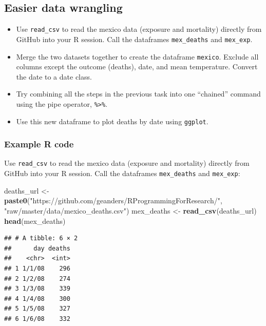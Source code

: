 \documentclass[]{book}
\makeatletter
\newenvironment{Shaded}{\begin{snugshade}}{\end{snugshade}}
\newcommand{\KeywordTok}[1]{\textcolor[rgb]{0.13,0.29,0.53}{\textbf{{#1}}}}
\newcommand{\StringTok}[1]{\textcolor[rgb]{0.31,0.60,0.02}{{#1}}}
\newcommand{\NormalTok}[1]{{#1}}
\providecommand{\tightlist}{%
  \setlength{\itemsep}{0pt}\setlength{\parskip}{0pt}}
\newenvironment{kframe}{%
\medskip{}
\setlength{\fboxsep}{.8em}
 \def\at@end@of@kframe{}%
 \ifinner\ifhmode%
  \def\at@end@of@kframe{\end{minipage}}%
  \begin{minipage}{\columnwidth}%
 \fi\fi%
 \def\FrameCommand##1{\hskip\@totalleftmargin \hskip-\fboxsep
 \colorbox{shadecolor}{##1}\hskip-\fboxsep
     \hskip-\linewidth \hskip-\@totalleftmargin \hskip\columnwidth}%
 \MakeFramed {\advance\hsize-\width
   \@totalleftmargin\z@ \linewidth\hsize
   \@setminipage}}%
 {\par\unskip\endMakeFramed%
 \at@end@of@kframe}
\renewenvironment{Shaded}{\begin{kframe}}{\end{kframe}}
\makeatother
\begin{document}
\subsection{Easier data wrangling}\label{easier-data-wrangling}

\begin{itemize}
\tightlist
\item
  Use \texttt{read\_csv} to read the mexico data (exposure and
  mortality) directly from GitHub into your R session. Call the
  dataframes \texttt{mex\_deaths} and \texttt{mex\_exp}.
\item
  Merge the two datasets together to create the dataframe
  \texttt{mexico}. Exclude all columns except the outcome (deaths),
  date, and mean temperature. Convert the date to a date class.
\item
  Try combining all the steps in the previous task into one ``chained''
  command using the pipe operator, \texttt{\%\textgreater{}\%}.
\item
  Use this new dataframe to plot deaths by date using \texttt{ggplot}.
\end{itemize}

\subsubsection{Example R code}\label{example-r-code-8}

Use \texttt{read\_csv} to read the mexico data (exposure and mortality)
directly from GitHub into your R session. Call the dataframes
\texttt{mex\_deaths} and \texttt{mex\_exp}:

\begin{Shaded}
\begin{Highlighting}[]
\NormalTok{deaths_url <-}\StringTok{ }\KeywordTok{paste0}\NormalTok{(}\StringTok{"https://github.com/geanders/RProgrammingForResearch/"}\NormalTok{,}
                     \StringTok{"raw/master/data/mexico_deaths.csv"}\NormalTok{)}
\NormalTok{mex_deaths <-}\StringTok{ }\KeywordTok{read_csv}\NormalTok{(deaths_url)}
\KeywordTok{head}\NormalTok{(mex_deaths)}
\end{Highlighting}
\end{Shaded}

\begin{verbatim}
## # A tibble: 6 × 2
##      day deaths
##    <chr>  <int>
## 1 1/1/08    296
## 2 1/2/08    274
## 3 1/3/08    339
## 4 1/4/08    300
## 5 1/5/08    327
## 6 1/6/08    332
\end{verbatim}
\end{document}
